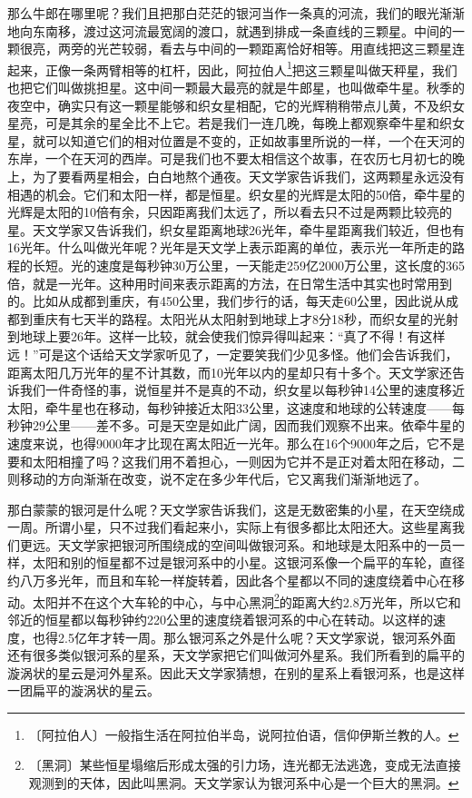 \documentclass[12pt,UTF-8,openany]{ctexbook}
\begin{document}
\begin{large}
    那么牛郎在哪里呢？我们且把那白茫茫的银河当作一条真的河流，我们的眼光渐渐地向东南移，渡过这河流最宽阔的渡口，就遇到排成一条直线的三颗星。中间的一颗很亮，两旁的光芒较弱，看去与中间的一颗距离恰好相等。用直线把这三颗星连起来，正像一条两臂相等的杠杆，因此，阿拉伯人\footnote{〔阿拉伯人〕一般指生活在阿拉伯半岛，说阿拉伯语，信仰伊斯兰教的人。}把这三颗星叫做天秤星，我们也把它们叫做挑担星。这中间一颗最大最亮的就是牛郎星，也叫做牵牛星。秋季的夜空中，确实只有这一颗星能够和织女星相配，它的光辉稍稍带点儿黄，不及织女星亮，可是其余的星全比不上它。若是我们一连几晚，每晚上都观察牵牛星和织女星，就可以知道它们的相对位置是不变的，正如故事里所说的一样，一个在天河的东岸，一个在天河的西岸。可是我们也不要太相信这个故事，在农历七月初七的晚上，为了要看两星相会，白白地熬个通夜。天文学家告诉我们，这两颗星永远没有相遇的机会。它们和太阳一样，都是恒星。织女星的光辉是太阳的50倍，牵牛星的光辉是太阳的10倍有余，只因距离我们太远了，所以看去只不过是两颗比较亮的星。天文学家又告诉我们，织女星距离地球26光年，牵牛星距离我们较近，但也有16光年。什么叫做光年呢？光年是天文学上表示距离的单位，表示光一年所走的路程的长短。光的速度是每秒钟30万公里，一天能走259亿2000万公里，这长度的365倍，就是一光年。这种用时间来表示距离的方法，在日常生活中其实也时常用到的。比如从成都到重庆，有450公里，我们步行的话，每天走60公里，因此说从成都到重庆有七天半的路程。太阳光从太阳射到地球上才8分18秒，而织女星的光射到地球上要26年。这样一比较，就会使我们惊异得叫起来：“真了不得！有这样远！”可是这个话给天文学家听见了，一定要笑我们少见多怪。他们会告诉我们，距离太阳几万光年的星不计其数，而10光年以内的星却只有十多个。天文学家还告诉我们一件奇怪的事，说恒星并不是真的不动，织女星以每秒钟14公里的速度移近太阳，牵牛星也在移动，每秒钟接近太阳33公里，这速度和地球的公转速度——每秒钟29公里——差不多。可是天空是如此广阔，因而我们观察不出来。依牵牛星的速度来说，也得9000年才比现在离太阳近一光年。那么在16个9000年之后，它不是要和太阳相撞了吗？这我们用不着担心，一则因为它并不是正对着太阳在移动，二则移动的方向渐渐在改变，说不定在多少年代后，它又离我们渐渐地远了。
    
    那白蒙蒙的银河是什么呢？天文学家告诉我们，这是无数密集的小星，在天空绕成一周。所谓小星，只不过我们看起来小，实际上有很多都比太阳还大。这些星离我们更远。天文学家把银河所围绕成的空间叫做银河系。和地球是太阳系中的一员一样，太阳和别的恒星都不过是银河系中的小星。这银河系像一个扁平的车轮，直径约八万多光年，而且和车轮一样旋转着，因此各个星都以不同的速度绕着中心在移动。太阳并不在这个大车轮的中心，与中心黑洞\footnote{〔黑洞〕某些恒星塌缩后形成太强的引力场，连光都无法逃逸，变成无法直接观测到的天体，因此叫黑洞。天文学家认为银河系中心是一个巨大的黑洞。}的距离大约2.8万光年，所以它和邻近的恒星都以每秒钟约220公里的速度绕着银河系的中心在转动。以这样的速度，也得2.5亿年才转一周。那么银河系之外是什么呢？天文学家说，银河系外面还有很多类似银河系的星系，天文学家把它们叫做河外星系。我们所看到的扁平的漩涡状的星云是河外星系。因此天文学家猜想，在别的星系上看银河系，也是这样一团扁平的漩涡状的星云。
    

\end{large}
\end{document}
